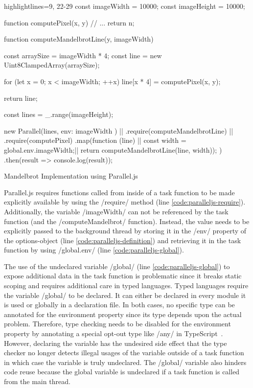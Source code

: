 \begin{listing}
	\begin{javascriptcode*}{highlightlines={9, 22-29}}
const imageWidth = 10000;
const imageHeight = 10000;

function computePixel(x, y) {
	// ...
	return n;
}

function computeMandelbrotLine(y, imageWidth) {
	const arraySize = imageWidth * 4;
	const line = new Uint8ClampedArray(arraySize);
	
	for (let x = 0; x < imageWidth; ++x) {
		line[x * 4] = computePixel(x, y);
	}
	
	return line;
}

const lines = _.range(imageHeight);

new Parallel(lines, {env: { imageWidth } }) |$\label{code:paralleljs-definition}$|
	.require(computeMandelbrotLine) |$\label{code:paralleljs-require}$|
	.require(computePixel)
	.map(function (line) { |$\label{code:paralleljs-map}$|
		const width = global.env.imageWidth;|$\label{code:paralleljs-global}$|
		return computeMandelbrotLine(line, width));
	})
	.then(result => console.log(result));
\end{javascriptcode*}

\caption{Mandelbrot Implementation using Parallel.js}
\label{fig:mandelbrot-paralleljs}
\end{listing}

Parallel.js requires functions called from inside of a task function to be made explicitly available by using the \javascriptinline/require/ method (line \ref{code:paralleljs-require}). Additionally, the variable \javascriptinline/imageWidth/ can not be referenced by the task function (and the \javascriptinline/computeMandelbrot/ function). Instead, the value needs to be explicitly passed to the background thread by storing it in the \javascriptinline/env/ property of the options-object (line \ref{code:paralleljs-definition}) and retrieving it in the task function by using \javascriptinline/global.env/ (line \ref{code:paralleljs-global}).


The use of the undeclared variable \javascriptinline/global/ (line \ref{code:paralleljs-global}) to expose additional data in the task function is problematic since it breaks static scoping and requires additional care in typed languages. Typed languages require the variable \javascriptinline/global/ to be declared. It can either be declared in every module it is used or globally in a declaration file. In both cases, no specific type can be annotated for the environment property since its type depends upon the actual problem. Therefore, type checking needs to be disabled for the environment property by annotating a special opt-out type like \javascriptinline/any/ in TypeScript~\cite{typescript}. However, declaring the variable has the undesired side effect that the type checker no longer detects illegal usages of the variable outside of a task function in which case the variable is truly undeclared. The \javascriptinline/global/ variable also hinders code reuse because the global variable is undeclared if a task function is called from the main thread.

